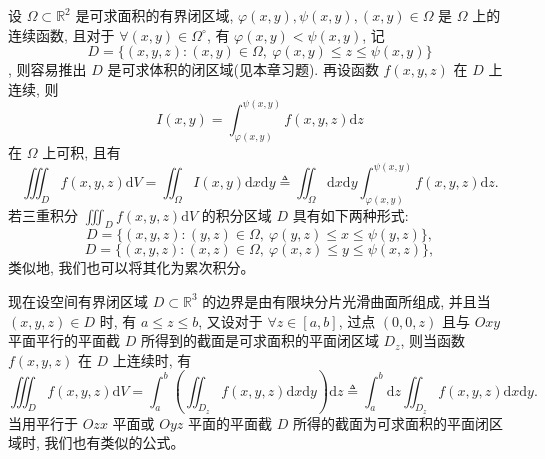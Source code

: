 \documentclass[UTF8,12pt,a4paper,fontset=fandol]{ctexart}
\begin{document}
设 $\Omega\subset\mathbb R^2$ 是可求面积的有界闭区域, $\varphi(x,y),\psi(x,y),(x,y)\in\Omega$ 是 $\Omega$ 上的连续函数, 且对于 $\forall(x,y)\in\Omega^\circ$, 有 $\varphi(x,y)<\psi(x,y)$, 记
\[
  D=\{(x,y,z):(x,y)\in\Omega,\ \varphi(x,y)\leqslant z\leqslant\psi(x,y)\}
\]
, 则容易推出 $D$ 是可求体积的闭区域(见本章习题). 再设函数 $f(x,y,z)$ 在 $D$ 上连续, 则
\[
  I(x,y)=\int_{\varphi(x,y)}^{\psi(x,y)}f(x,y,z)\mathrm dz
\]
在 $\Omega$ 上可积, 且有
\[
  \iiint_D f(x,y,z)\mathrm dV
  =\iint_\Omega I(x,y)\mathrm dx\mathrm dy
  \triangleq \iint_\Omega\mathrm dx\mathrm dy
    \int_{\varphi(x,y)}^{\psi(x,y)}f(x,y,z)\mathrm dz.
\]
若三重积分 $\iiint_D f(x,y,z)\mathrm dV$ 的积分区域 $D$ 具有如下两种形式:
\[
  D=\{(x,y,z):(y,z)\in\Omega,\ \varphi(y,z)\leqslant x\leqslant\psi(y,z)\},
\]
\[
  D=\{(x,y,z):(x,z)\in\Omega,\ \varphi(x,z)\leqslant y\leqslant\psi(x,z)\},
\]
类似地, 我们也可以将其化为累次积分。

现在设空间有界闭区域 $D\subset\mathbb R^3$ 的边界是由有限块分片光滑曲面所组成, 并且当 $(x,y,z)\in D$ 时, 有 $a\leqslant z\leqslant b$, 又设对于 $\forall z\in[a,b]$, 过点 $(0,0,z)$ 且与 $Oxy$ 平面平行的平面截 $D$ 所得到的截面是可求面积的平面闭区域 $D_z$, 则当函数 $f(x,y,z)$ 在 $D$ 上连续时, 有
\[
  \iiint_D f(x,y,z)\mathrm dV
  =\int_a^b\left(\iint_{D_z}f(x,y,z)\mathrm dx\mathrm dy\right)\mathrm dz
  \triangleq \int_a^b\mathrm dz\iint_{D_z}f(x,y,z)\mathrm dx\mathrm dy.
\]
当用平行于 $Ozx$ 平面或 $Oyz$ 平面的平面截 $D$ 所得的截面为可求面积的平面闭区域时, 我们也有类似的公式。
\end{document}
